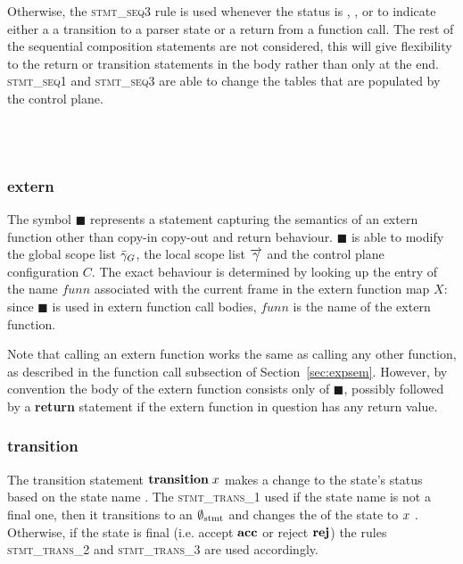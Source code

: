 \documentclass[UTF8]{article}
\begin{document}
Otherwise, the \textsc{stmt\_seq3}  rule is used whenever the status is \returnst{}, \accept{} , \reject{} or \trans{} to indicate either a a transition to a parser state or a return from a function call. The rest of the sequential composition statements are not considered, this will give flexibility to the return or transition statements in the body rather than only at the end.
\textsc{stmt\_seq1} and \textsc{stmt\_seq3} are able to change the tables that are populated by the control plane.

\begin{figure}[h!]
    \ottusedrule{\ottdrulestmtXXseqOne{}} \\
    \ottusedrule{\ottdrulestmtXXseqTwo{}} \\
    \ottusedrule{\ottdrulestmtXXseqThree{}}
\end{figure}


\subsubsection*{extern}
The symbol $\blacksquare$ represents a statement capturing the semantics of an extern function other than copy-in copy-out and return behaviour. $\blacksquare$ is able to modify the global scope list $\bar{\gamma}_G$, the local scope list $\overrightarrow{\gamma}$ and the control plane configuration $C$. The exact behaviour is determined by looking up the entry of the name $\mathit{funn}$ associated with the current frame in the extern function map $X$: since $\blacksquare$ is used in extern function call bodies, $\mathit{funn}$ is the name of the extern function.

Note that calling an extern function works the same as calling any other function, as described in the function call subsection of Section~\ref{sec:expsem}. However, by convention the body of the extern function consists only of $\blacksquare$, possibly followed by a \textbf{return} statement if the extern function in question has any return value.

\begin{figure}[ht!]
    \ottusedrule{\ottdrulestmtXXext{}}
\end{figure}

\subsubsection*{transition}
The transition statement $\mathbf{transition} \; x $ makes a change to the state's status \status{} based on the state name \vn{}. The \textsc{stmt\_trans\_1} used if the state name is not a final one, then it transitions to an $\emptyset_{ \mathrm{stmt} }{}$ and changes the \status{} of the state to \trans{} $x$ . Otherwise, if the state is final (i.e. accept $\textbf{acc}$ or reject $\reject$) the rules \textsc{stmt\_trans\_2} and \textsc{stmt\_trans\_3} are used accordingly.
\end{document}
